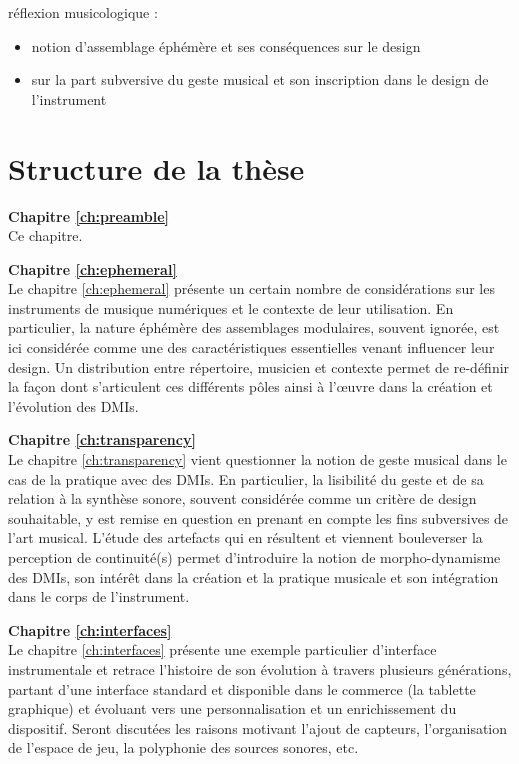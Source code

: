 réflexion musicologique : 
\vspace{-1em}
\begin{itemize}[noitemsep]
\item notion d'assemblage éphémère et ses conséquences sur le design
\item sur la part subversive du geste musical et son inscription dans le design de l'instrument
\end{itemize}



\section{Structure de la thèse}
\label{sec:preamble:structure}

\textbf{Chapitre \ref{ch:preamble}} \\[0.2em]
Ce chapitre.

\textbf{Chapitre \ref{ch:ephemeral}} \\[0.2em]
Le chapitre \ref{ch:ephemeral} présente un certain nombre de considérations sur les instruments de musique numériques et le contexte de leur utilisation. En particulier, la nature éphémère des assemblages modulaires, souvent ignorée, est ici considérée comme une des caractéristiques essentielles venant influencer leur design. Un distribution entre répertoire, musicien et contexte permet de re-définir la façon dont s'articulent ces différents pôles ainsi à l'œuvre dans la création et l'évolution des DMIs.

\textbf{Chapitre \ref{ch:transparency}} \\[0.2em]
Le chapitre \ref{ch:transparency} vient questionner la notion de geste musical dans le cas de la pratique avec des DMIs. En particulier, la lisibilité du geste et de sa relation à la synthèse sonore, souvent considérée comme un critère de design souhaitable, y est remise en question en prenant en compte les fins subversives de l'art musical. L'étude des artefacts qui en résultent et viennent bouleverser la perception de continuité(s) permet d'introduire la notion de morpho-dynamisme des DMIs, son intérêt dans la création et la pratique musicale et son intégration dans le corps de l'instrument.

\textbf{Chapitre \ref{ch:interfaces}} \\[0.2em]
Le chapitre \ref{ch:interfaces} présente une exemple particulier d'interface instrumentale et retrace l'histoire de son évolution à travers plusieurs générations, partant d'une interface standard et disponible dans le commerce (la tablette graphique) et évoluant vers une personnalisation et un enrichissement du dispositif. 
Seront discutées les raisons motivant l'ajout de capteurs, l'organisation de l'espace de jeu, la polyphonie des sources sonores, etc.

